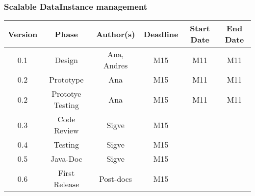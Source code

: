 \subsubsection*{Scalable DataInstance management}

\begin{table}[H]
\begin{tabular}{cccccc}
\hline
\textbf{Version} & \textbf{Phase} & \textbf{Author(s)} & \textbf{Deadline} & \textbf{Start Date} & \textbf{End Date}\\
\hline
0.1 & Design & Ana, Andres & M15 & M11 & M11\\
\hline 
0.2 & Prototype & Ana & M15 & M11 & M11\\
\hline 
0.2& Prototye Testing & Ana & M15 & M11 & M11\\
\hline 
0.3 & Code Review & Sigve & M15 &  & \\
\hline 
0.4 & Testing & Sigve & M15 &  & \\
\hline 
0.5 & Java-Doc  & Sigve & M15 &  & \\
\hline 
0.6 & First Release & Post-docs & M15 &  & \\
\hline
\end{tabular}
\end{table}